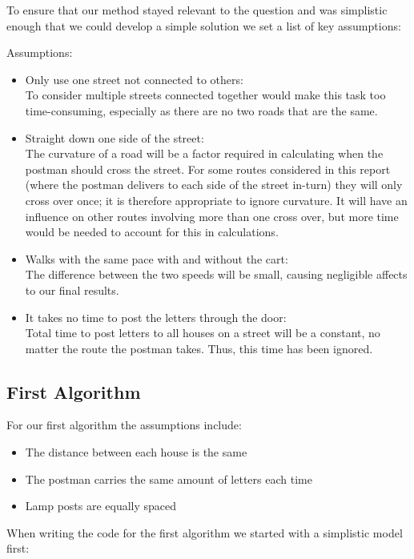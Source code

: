 \documentclass[14pt]{article}
\begin{document}
 To ensure that our method stayed relevant to the question and was simplistic enough that we could develop a simple solution  we set a list of key assumptions:

Assumptions:
\begin{itemize}
    \item Only use one street not connected to others: \\
    To consider multiple streets connected together would make this task too time-consuming, especially as there are no two roads that are the same. 
    \item Straight down one side of the street: \\
    The curvature of a road will be a factor required in calculating when the postman should cross the street. For some routes considered in this report (where the postman delivers to each side of the street in-turn) they will only cross over once; it is therefore appropriate to ignore curvature. It will have an influence on other routes involving more than one cross over, but more time would be needed to account for this in calculations. 
    \item Walks with the same pace with and without the cart: \\
    The difference between the two speeds will be small, causing negligible affects to our final results. 
    \item It takes no time to post the letters through the door: \\
    Total time to post letters to all houses on a street will be a constant, no matter the route the postman takes. Thus, this time has been ignored. 
\end{itemize}

\subsection{First Algorithm}

For our first algorithm the assumptions include:
\begin{itemize}
    \item The distance between each house is the same
    \item The postman carries the same amount of letters each time
    \item Lamp posts are equally spaced
\end{itemize}
 
When writing the code for the first algorithm we started with a simplistic model first:
\end{document}
